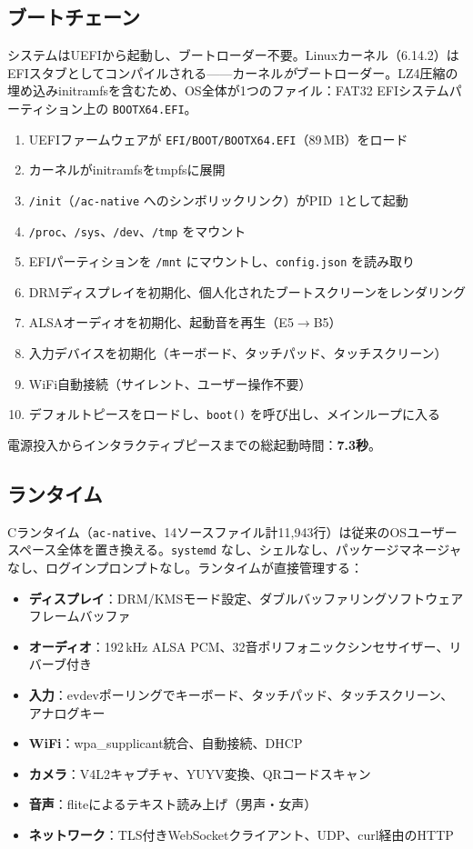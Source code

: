 \documentclass[10pt,letterpaper,twocolumn]{article}
\begin{document}
\subsection{ブートチェーン}

システムはUEFIから起動し、ブートローダー不要。Linuxカーネル（6.14.2）はEFIスタブとしてコンパイルされる——カーネル\emph{が}ブートローダー。LZ4圧縮の埋め込みinitramfsを含むため、OS全体が1つのファイル：FAT32 EFIシステムパーティション上の \texttt{BOOTX64.EFI}。

\begin{enumerate}
  \item UEFIファームウェアが \texttt{EFI/BOOT/BOOTX64.EFI}（89\,MB）をロード
  \item カーネルがinitramfsをtmpfsに展開
  \item \texttt{/init}（\texttt{/ac-native} へのシンボリックリンク）がPID~1として起動
  \item \texttt{/proc}、\texttt{/sys}、\texttt{/dev}、\texttt{/tmp} をマウント
  \item EFIパーティションを \texttt{/mnt} にマウントし、\texttt{config.json} を読み取り
  \item DRMディスプレイを初期化、個人化されたブートスクリーンをレンダリング
  \item ALSAオーディオを初期化、起動音を再生（E5$\rightarrow$B5）
  \item 入力デバイスを初期化（キーボード、タッチパッド、タッチスクリーン）
  \item WiFi自動接続（サイレント、ユーザー操作不要）
  \item デフォルトピースをロードし、\texttt{boot()} を呼び出し、メインループに入る
\end{enumerate}

電源投入からインタラクティブピースまでの総起動時間：\textbf{7.3秒}。

\subsection{ランタイム}

Cランタイム（\texttt{ac-native}、14ソースファイル計11,943行）は従来のOSユーザースペース全体を置き換える。\texttt{systemd} なし、シェルなし、パッケージマネージャなし、ログインプロンプトなし。ランタイムが直接管理する：

\begin{itemize}
  \item \textbf{ディスプレイ}：DRM/KMSモード設定、ダブルバッファリングソフトウェアフレームバッファ
  \item \textbf{オーディオ}：192\,kHz ALSA PCM、32音ポリフォニックシンセサイザー、リバーブ付き
  \item \textbf{入力}：evdevポーリングでキーボード、タッチパッド、タッチスクリーン、アナログキー
  \item \textbf{WiFi}：wpa\_supplicant統合、自動接続、DHCP
  \item \textbf{カメラ}：V4L2キャプチャ、YUYV変換、QRコードスキャン
  \item \textbf{音声}：fliteによるテキスト読み上げ（男声・女声）
  \item \textbf{ネットワーク}：TLS付きWebSocketクライアント、UDP、curl経由のHTTP
\end{itemize}
\end{document}
